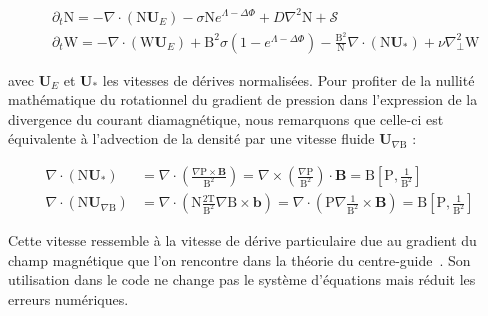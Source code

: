 \begin{refsection}
\begin{align}
\label{2-eqContinuiteMag}
&\partial_t \text{N}
= - \nabla\cdot\left(\text{N}\mathbf U_{E}\right) -\sigma
\text{N}e^{\Lambda-\Delta\Phi} + D\nabla^2 \text{N} + \mathcal{S}
\\
\label{2-eqCourantMag}
&\partial_{t}\text{W} = 
-\nabla\cdot\left(\text{W}\mathbf U_{E}\right)
+\text{B}^2\sigma\left(1-e^{\Lambda-\Delta\Phi}\right) 
-\frac{\text{B}^2}{\text{N}}\nabla\cdot\left(\text{N}\mathbf U_*\right) 
+\nu\nabla_\perp^2\text{W}
\end{align}

avec $\mathbf U_E$ et $\mathbf U_*$ les vitesses de dérives normalisées.
Pour profiter de la nullité mathématique du rotationnel du gradient de
pression dans l'expression de la divergence du courant
diamagnétique, nous remarquons que celle-ci est équivalente à l'advection de la
densité par une vitesse fluide $\mathbf U_{\nabla\text{B}}$ :

\begin{align}
\nabla\cdot\left(\text{N}\mathbf U_{*}\right)&=
\nabla\cdot\left(\frac{\nabla\text{P}\times\mathbf
B}{\text{B}^2}\right)=
\nabla\times\left(\frac{\nabla\text{P}}{\text{B}^2}\right)\cdot
\mathbf B=\text{B}\left[\text{P},\frac{1}{\text{B}^2}\right]\\
\nabla\cdot\left(\text{N}\mathbf U_{\nabla\text{B}}\right)&=
\nabla\cdot\left(\text{N}\frac{2\text{T}}{\text{B}^2}\nabla\text{B}\times\mathbf
b\right)=
\nabla\cdot\left(\text{P}\nabla\frac{1}{\text{B}^2}\times\mathbf
B\right)=\text{B}\left[\text{P},\frac{1}{\text{B}^2}\right]
\end{align}

Cette vitesse ressemble à la vitesse de dérive particulaire due au gradient du
champ magnétique que l'on rencontre dans la théorie du
centre-guide~\parencite{Lee}. Son utilisation dans le code ne change pas le
système d'équations mais réduit les erreurs numériques.


\end{refsection}
